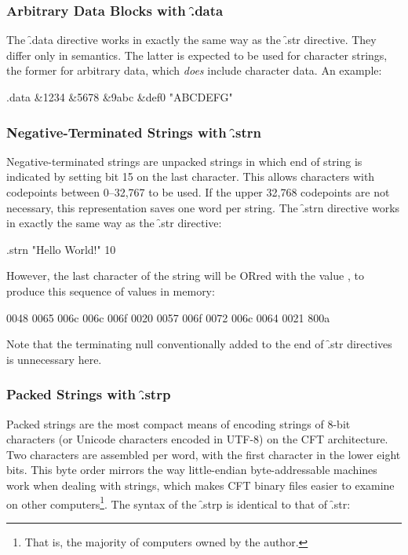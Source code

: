 \subsubsection{Arbitrary Data Blocks with \f{.data}}

The \f{.data} directive works in exactly the same way as the \f{.str}
directive. They differ only in semantics. The latter is expected to be used for
character strings, the former for arbitrary data, which {\em does\/} include
character data. An example:

\begin{cftasmcode}
.data &1234 &5678 &9abc &def0 "ABCDEFG"
\end{cftasmcode}

\subsubsection{Negative-Terminated Strings with \f{.strn}}

Negative-terminated strings are unpacked strings in which end of string is
indicated by setting bit 15 on the last character. This allows characters with
codepoints between 0–32,767 to be used. If the upper 32,768 codepoints are not
necessary, this representation saves one word per string. The \f{.strn}
directive works in exactly the same way as the \f{.str} directive:

\begin{cftasmcode}
.strn "Hello World!" 10
\end{cftasmcode}

However, the last character of the string will be ORred with the value
, to produce this sequence of values in memory:

\begin{intrcode}
0048 0065 006c 006c 006f 0020 0057 006f
0072 006c 0064 0021 800a
\end{intrcode}

Note that the terminating null conventionally added to the end of \f{.str}
directives is unnecessary here.



\subsubsection{Packed Strings with \f{.strp}}
\label{sec:asm-pstring}

Packed strings are the most compact means of encoding strings of 8-bit
characters (or Unicode characters encoded in UTF-8) on the CFT
architecture. Two characters are assembled per word, with the first character
in the lower eight bits. This byte order mirrors the way little-endian
byte-addressable machines work when dealing with strings, which makes CFT
binary files easier to examine on other computers\footnote{That is, the
  majority of computers owned by the author.}. The syntax of the \f{.strp} is
identical to that of \f{.str}:

